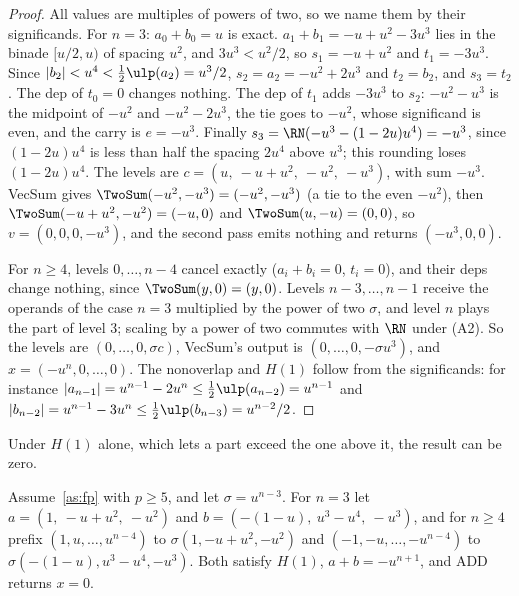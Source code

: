 \begin{proof}
All values are multiples of powers of two, so we name them by their significands. For $n = 3$: $a_0 + b_0 = u$ is exact.
$a_1 + b_1 = -u + u^2 - 3u^3$ lies in the binade $[u/2, u)$ of spacing $u^2$, and $3u^3 < u^2/2$, so $s_1 = -u + u^2$ and
$t_1 = -3u^3$. Since $|b_2| < u^4 < \frac12\ulp(a_2) = u^3/2$, $s_2 = a_2 = -u^2 + 2u^3$ and $t_2 = b_2$, and $s_3 = t_2$.
The dep of $t_0 = 0$ changes nothing. The dep of $t_1$ adds $-3u^3$ to $s_2$: $-u^2 - u^3$ is the midpoint of $-u^2$ and
$-u^2 - 2u^3$, the tie goes to $-u^2$, whose significand is even, and the carry is $e = -u^3$. Finally $s_3 =
\RN(-u^3 - (1 - 2u)u^4) = -u^3$, since $(1 - 2u)u^4$ is less than half the spacing $2u^4$ above $u^3$; this rounding
loses $(1 - 2u)u^4$. The levels are $c = (u,\ -u + u^2,\ -u^2,\ -u^3)$, with sum $-u^3$. VecSum gives $\TwoSum(-u^2, -u^3)
= (-u^2, -u^3)$ (a tie to the even $-u^2$), then $\TwoSum(-u + u^2, -u^2) = (-u, 0)$ and $\TwoSum(u, -u) = (0, 0)$, so
$v = (0, 0, 0, -u^3)$, and the second pass emits nothing and returns $(-u^3, 0, 0)$.

For $n \ge 4$, levels $0, \dots, n-4$ cancel exactly ($a_i + b_i = 0$, $t_i = 0$), and their deps change nothing, since
$\TwoSum(y, 0) = (y, 0)$. Levels $n-3, \dots, n-1$ receive the operands of the case $n = 3$ multiplied by the power of
two $\sigma$, and level $n$ plays the part of level 3; scaling by a power of two commutes with $\RN$ under (A2). So the
levels are $(0, \dots, 0, \sigma c)$, VecSum's output is $(0, \dots, 0, -\sigma u^3)$, and $x = (-u^n, 0, \dots, 0)$. The
nonoverlap and $H(1)$ follow from the significands: for instance $|a_{n-1}| = u^{n-1} - 2u^n \le \frac12\ulp(a_{n-2}) =
u^{n-1}$ and $|b_{n-2}| = u^{n-1} - 3u^n \le \frac12\ulp(b_{n-3}) = u^{n-2}/2$.
\end{proof}

Under $H(1)$ alone, which lets a part exceed the one above it, the result can be zero.

\begin{proposition}\label{prop:cancel0}
Assume~\ref{as:fp} with $p \ge 5$, and let $\sigma = u^{n-3}$. For $n = 3$ let $a = (1,\ -u + u^2,\ -u^2)$ and $b = (-(1 -
u),\ u^3 - u^4,\ -u^3)$, and for $n \ge 4$ prefix $(1, u, \dots, u^{n-4})$ to $\sigma(1, -u + u^2, -u^2)$ and $(-1, -u,
\dots, -u^{n-4})$ to $\sigma(-(1-u), u^3 - u^4, -u^3)$. Both satisfy $H(1)$, $a + b = -u^{n+1}$, and ADD returns $x = 0$.
\end{proposition}

